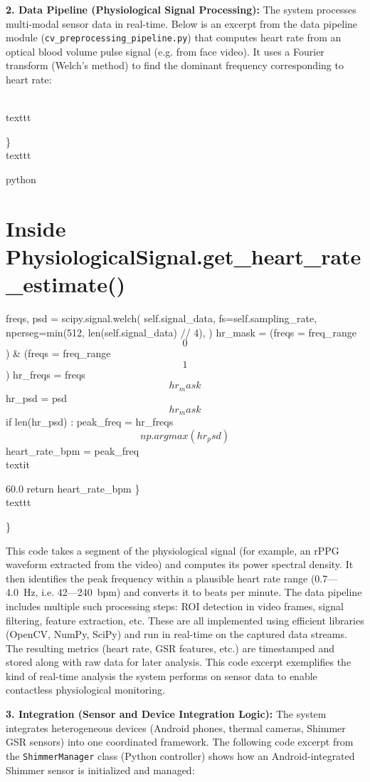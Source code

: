 {\textbf{2. Data Pipeline (Physiological Signal Processing):} The system
processes multi-modal sensor data in real-time. Below is an excerpt from
the data pipeline module (\texttt{cv_preprocessing_pipeline.py}) that computes
heart rate from an optical blood volume pulse signal (e.g. from face
video). It uses a Fourier transform (Welch's method) to find the
dominant frequency corresponding to heart
rate\cite{ref54}:

\\texttt{\}\\texttt{python

\chapter{Inside PhysiologicalSignal.get_heart_rate_estimate()}

freqs, psd = scipy.signal.welch( self.signal_data,
fs=self.sampling_rate, nperseg=min(512, len(self.signal_data) // 4), )
hr_mask = (freqs \>= freq_range\[0\]) & (freqs \<= freq_range\[1\])
hr_freqs = freqs\[hr_mask\] hr_psd = psd\[hr_mask\] if len(hr_psd) :
peak_freq = hr_freqs\[np.argmax(hr_psd)\] heart_rate_bpm = peak_freq \\textit{
60.0 return heart_rate_bpm
\}\\texttt{\}\cite{ref54}

This code takes a segment of the physiological signal (for example, an
rPPG waveform extracted from the video) and computes its power spectral
density. It then identifies the peak frequency within a plausible heart
rate range (0.7---4.0 Hz, i.e. 42---240 bpm) and converts it to beats per
minute. The data pipeline includes multiple such processing steps: ROI
detection in video frames, signal filtering, feature extraction, etc.
These are all implemented using efficient libraries (OpenCV, NumPy,
SciPy) and run in real-time on the captured data streams. The resulting
metrics (heart rate, GSR features, etc.) are timestamped and stored
along with raw data for later analysis. This code excerpt exemplifies
the kind of real-time analysis the system performs on sensor data to
enable contactless physiological monitoring.

\textbf{3. Integration (Sensor and Device Integration Logic):} The system
integrates heterogeneous devices (Android phones, thermal cameras,
Shimmer GSR sensors) into one coordinated framework. The following code
excerpt from the \texttt{ShimmerManager} class (Python controller) shows how an
Android-integrated Shimmer sensor is initialized and
managed\cite{ref55}\cite{ref56}:

}}}}}
